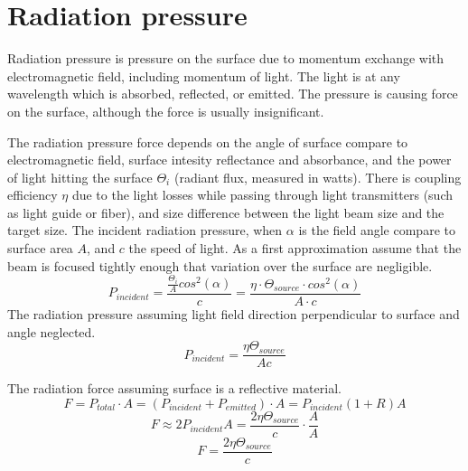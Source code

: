 \documentclass[\main/master.tex]{subfiles}
\begin{document}
\section{Radiation pressure}
Radiation pressure is pressure on the surface due to momentum exchange with electromagnetic field, including momentum of light. The light is at any wavelength which is absorbed, reflected, or emitted. The pressure is causing force on the surface, although the force is usually insignificant.
  
\par
The radiation pressure force depends on the angle of surface compare to electromagnetic field, surface intesity reflectance and absorbance, and the power of light hitting the surface $\Theta_i$ (radiant flux, measured in watts). There is coupling efficiency $\eta$ due to the light losses while passing through light transmitters (such as light guide or fiber), and size difference between the light beam size and the target size. The incident radiation pressure, when $\alpha$ is the field angle compare to surface area $A$, and $c$ the speed of light. As a first approximation assume that the beam is focused tightly enough that variation over the surface are negligible. 
\begin{equation}
P_{incident} = \frac{\frac{\Theta_i}{A}cos^2(\alpha)}{c} = \frac{\eta\cdot \Theta_{source}\cdot cos^2(\alpha)}{{A\cdot c}} \label{eqn:radiation_pressure}
\end{equation}
The radiation pressure assuming light field direction perpendicular to surface and angle neglected. 
\begin{equation}
P_{incident} = \frac{\eta\Theta_{source}}{{Ac}} \label{eqn:radiation_pressure_perpendicular}
\end{equation}

The radiation force assuming surface is a reflective material.
\begin{equation}
F = P_{total}\cdot A = (P_{incident}+P_{emitted})\cdot A = P_{incident}(1+R)A \label{eqn:radiation_force}
\end{equation}
\begin{equation}
F \approx 2P_{incident}A = \frac{2\eta\Theta_{source}}{{c}}\cdot \frac{A}{A} \label{eqn:radiation_force_reflective}
\end{equation}
\begin{equation}
F = \frac{2\eta\Theta_{source}}{{c}} \label{eqn:radiation_force_power}
\end{equation}




 
\end{document}

